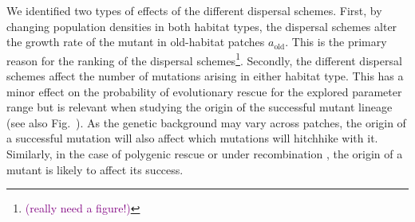 \documentclass[11pt]{article}
\newcommand{\florence}[1]{\textcolor{purple}{(#1)}} %
\newcommand{\chg}[1]{\textcolor{change}{#1}}
\begin{document}
We identified two types of effects of the different dispersal schemes. First, by changing population densities in both habitat types, the dispersal schemes alter the growth rate of the mutant in old-habitat patches $a_{\text{old}}$. This is the primary reason for the ranking of the dispersal schemes\footnote{\florence{really need a figure!}}. Secondly, the different dispersal schemes affect the number of mutations arising in either habitat type. This has a minor effect on the probability of evolutionary rescue for the explored parameter range but is relevant when studying the origin of the successful mutant lineage \chg{(see also Fig.~\label{Sfig:natal_habitat})}. As the genetic background may vary across patches, the origin of a successful mutation will also affect which mutations will hitchhike with it. Similarly, in the case of polygenic rescue or under recombination \citep[e.g.][]{uecker_2015}, the origin of a mutant is likely to affect its success.    

\end{document}
